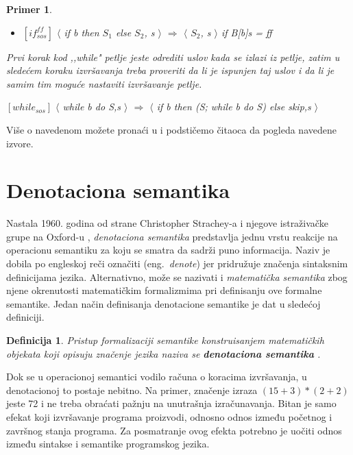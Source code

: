 \documentclass[a4paper]{article}
\newtheorem{primer}{Primer}[section]
\newtheorem{definicija}{Definicija}[section]
\begin{document}
\begin{primer}
\begin{itemize}
	\item $[if^{ff}_{sos}]$ $\langle$ if b then $S_1$ else $S_2$, s $\rangle$ $\Longrightarrow$ $\langle$ $S_2$, s $\rangle$ \hspace{1cm} if B[b]s = ff
\end{itemize}
Prvi korak kod ,,while" petlje jeste odrediti uslov kada se izlazi iz petlje, zatim u sledećem koraku izvršavanja treba proveriti da li je ispunjen taj uslov i da li je samim tim moguće nastaviti izvršavanje petlje.
\begin{center} $[while_{sos}]$ $\langle$ while b do S,s $\rangle$ $\Longrightarrow$ $\langle$ if b then (S; while b do S) else skip,s $\rangle$ \end{center}
\end{primer}
Više o navedenom možete pronaći u \cite{willey} i podstičemo čitaoca da pogleda navedene izvore.

\section{Denotaciona semantika}
\label{sec:densem}

\qquad Nastala 1960. godina od strane Christopher Strachey-a i njegove istraživačke grupe na Oxford-u \cite{slonneger1995book}, \textit{denotaciona semantika} predstavlja jednu vrstu reakcije na operacionu semantiku za koju se smatra da sadrži puno informacija. Naziv je dobila po engleskoj reči označiti (eng.~{\em denote}) jer pridružuje značenja sintaksnim definicijama jezika. Alternativno, može se nazivati i \textit{matematička semantika} zbog njene okrenutosti matematičkim formalizmima pri definisanju ove formalne semantike. Jedan način definisanja denotacione semantike je dat u sledećoj definiciji.
\begin{definicija}
Pristup formalizaciji semantike konstruisanjem matematičkih objekata koji
opisuju značenje jezika naziva se \textbf{denotaciona semantika} \cite{milena}.
\end{definicija}

Dok se u operacionoj semantici vodilo računa o koracima izvršavanja, u denotacionoj to postaje nebitno. Na primer, značenje izraza $ (15+3)*(2+2) $ jeste 72 i ne treba obraćati pažnju na unutrašnja izračunavanja. Bitan je samo efekat koji izvršavanje programa proizvodi, odnosno odnos između početnog i završnog stanja programa. Za posmatranje ovog efekta potrebno je uočiti odnos između sintakse i semantike programskog jezika.
\end{document}
